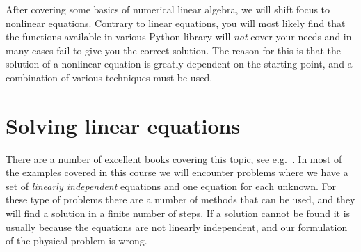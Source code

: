 \documentclass[graybox,sectrefs,envcountresetchap,open=right,final]{svmonodo}
\begin{document}
After covering some basics of numerical linear algebra, we will shift focus to nonlinear equations. Contrary to linear equations, you will most likely find that the functions available in various Python library will \emph{not} cover your needs and in many cases fail to give you the correct solution. The reason for this is that the solution of a nonlinear equation is greatly dependent on the starting point, and a combination of various techniques must be used.  

\section{Solving linear equations}
There are a number of excellent books covering this topic, see e.g.~\cite{press2007,trefethen1997,stoer2013,strang2019}.
In most of the examples covered in this course we will encounter problems where we have a set of \emph{linearly independent} equations and one equation for each unknown. For these type of problems there are a number of methods that can be used, and they will find a solution in a finite number of steps. If a solution cannot be found it is usually because the equations are not linearly independent, and our formulation of the physical problem is wrong.
\end{document}
